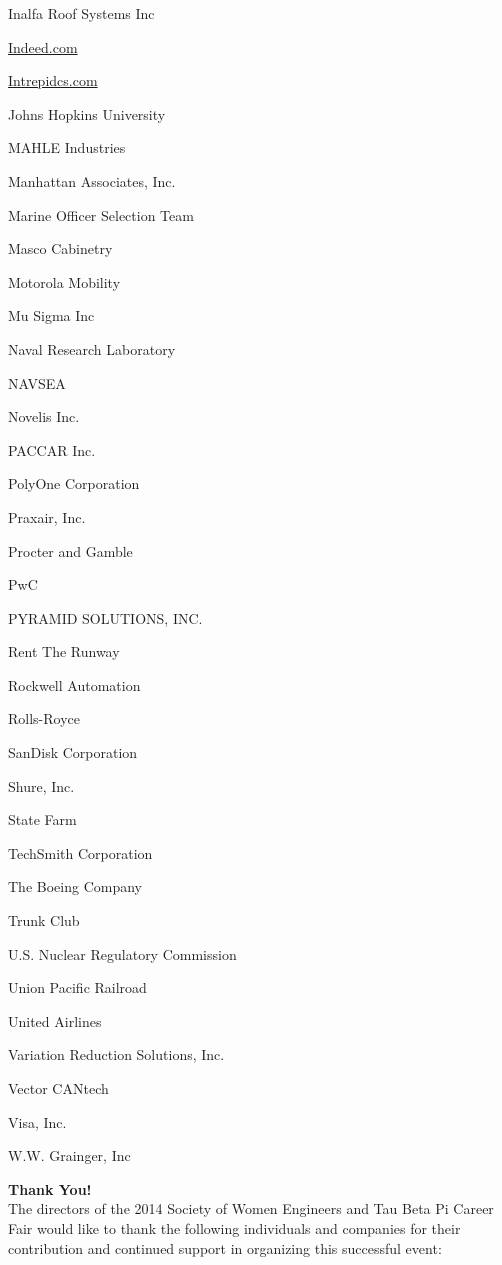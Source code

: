 \documentclass[twoside]{article}
\begin{document}
\begin{center}
\begin{multicols}{5}
\begin{FlushLeft}
\begin{compactitem}
\item Inalfa Roof Systems Inc
\item \url{Indeed.com}
\item \url{Intrepidcs.com}
\item Johns Hopkins University
\item MAHLE Industries
\item Manhattan Associates, Inc.
\item Marine Officer Selection Team
\item Masco Cabinetry
\item Motorola Mobility
\item Mu Sigma Inc
\item Naval Research Laboratory
\item NAVSEA
\item Novelis Inc.
\item PACCAR Inc.
\item PolyOne Corporation
\item Praxair, Inc.
\item Procter and Gamble
\item PwC
\item PYRAMID SOLUTIONS, INC.
\item Rent The Runway
\item Rockwell Automation
\item Rolls-Royce
\item SanDisk Corporation
\item Shure, Inc.
\item State Farm
\item TechSmith Corporation
\item The Boeing Company
\item Trunk Club
\item U.S. Nuclear Regulatory Commission
\item Union Pacific Railroad
\item United Airlines
\item Variation Reduction Solutions, Inc.
\item Vector CANtech
\item Visa, Inc.
\item W.W. Grainger, Inc
\end{compactitem}
        \end{FlushLeft}
        \vspace{1em}
        \end{multicols}\end{center}
    \startforewardsection
    { \fontsize{16}{19}\selectfont \bf Thank You!}\\The directors of the 2014 Society of Women Engineers 
    and Tau Beta Pi Career Fair would like to thank the following individuals and 
    companies for their contribution and continued support in organizing this 
    successful event:\\
    
\end{document}
